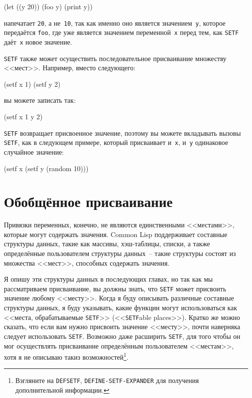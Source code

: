 \begin{myverb}
(let ((y 20))
  (foo y)
  (print y))
\end{myverb}

\noindent{}напечатает \lstinline{20}, а не~\lstinline{10}, так как именно оно является значением~\lstinline{y}, которое передаётся
\lstinline{foo}, где уже является значением переменной~\lstinline{x} перед тем, как \lstinline{SETF}
даёт~\lstinline{x} новое значение.

\lstinline{SETF} также может осуществить последовательное присваивание множеству
<<мест>>. Например, вместо следующего:

\begin{myverb}
(setf x 1)
(setf y 2)
\end{myverb}

\noindent{}вы можете записать так:

\begin{myverb}
(setf x 1 y 2)
\end{myverb}

\lstinline{SETF} возвращает присвоенное значение, поэтому вы можете вкладывать вызовы
\lstinline{SETF}, как в следующем примере, который присваивает и~\lstinline{x}, и~\lstinline{y} одинаковое случайное
значение:

\begin{myverb}
(setf x (setf y (random 10)))
\end{myverb}

\section{Обобщённое присваивание}

Привязки переменных, конечно, не являются единственными <<местами>>, которые могут содержать
значения. Common Lisp поддерживает составные структуры данных, такие как массивы,
хэш-таблицы, списки, а также определённые пользователем структуры данных~-- такие
структуры состоят из множества <<мест>>, способных содержать значения.

Я опишу эти структуры данных в последующих главах, но так как мы рассматриваем
присваивание, вы должны знать, что \lstinline{SETF} может присвоить значение любому
<<месту>>. Когда я буду описывать различные составные структуры данных, я буду указывать,
какие функции могут использоваться как <<места, обрабатываемые \lstinline{SETF}>>
(<<\lstinline{SETF}able places>>). Кратко же можно сказать, что если вам нужно присвоить
значение <<месту>>, почти наверняка следует использовать \lstinline{SETF}. Возможно даже
расширить \lstinline{SETF}, для того чтобы он мог осуществлять присваивание определённым
пользователем <<местам>>, хотя я не описываю такиз возможностей\footnote{Взгляните на
  \lstinline{DEFSETF}, \lstinline{DEFINE-SETF-EXPANDER} для получения дополнительной
  информации.}\hspace{\footnotenegspace}.

